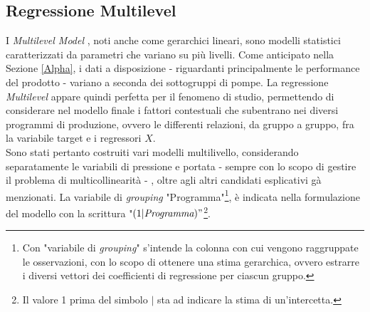 \documentclass[fleqn,10pt]{SelfArx} %
\begin{document}
\subsection{Regressione Multilevel}
I \textit{Multilevel Model} \cite{Multil}\cite{Multil1}, noti anche come gerarchici lineari, sono modelli statistici caratterizzati da parametri che variano su più livelli. Come anticipato nella Sezione \ref{Alpha}, i dati a disposizione - riguardanti principalmente le performance del prodotto - variano a seconda dei sottogruppi di pompe. La regressione \textit{Multilevel} appare quindi perfetta per il fenomeno di studio, permettendo di considerare nel modello finale i fattori contestuali che subentrano nei diversi programmi di produzione, ovvero le differenti relazioni, da gruppo a gruppo, fra la variabile target e i regressori $X$.\\
Sono stati pertanto costruiti vari modelli multilivello, considerando separatamente le variabili di pressione e portata - sempre con lo scopo di gestire il problema di multicollinearità - , oltre agli altri candidati esplicativi gà menzionati. La variabile di \textit{grouping} "Programma"\footnote{Con "variabile di \textit{grouping}" s'intende la colonna con cui vengono raggruppate le osservazioni, con lo scopo di ottenere una stima gerarchica, ovvero estrarre i diversi vettori dei coefficienti di regressione per ciascun gruppo.}, è indicata nella formulazione del modello con la scrittura "$(1|\textit{Programma})"$\footnote{Il valore 1 prima del simbolo $\mid$ sta ad indicare la stima di un'intercetta.}. 
\end{document}
